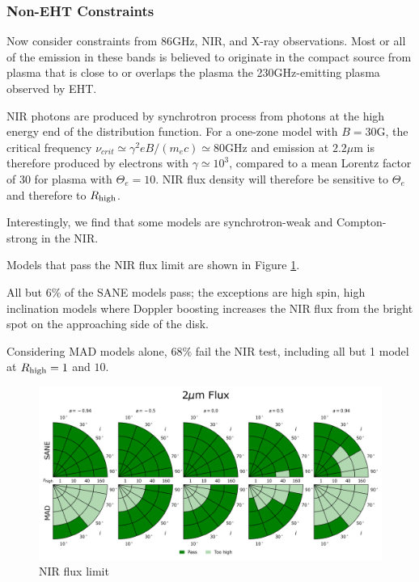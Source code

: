 \subsubsection{Non-EHT Constraints}

Now consider constraints from 86GHz, NIR, and X-ray observations.  Most or all of the emission in these bands is believed to originate in the compact source from plasma that is close to or overlaps the plasma the 230GHz-emitting plasma observed by EHT.



NIR photons are produced by synchrotron process from photons at the high energy end of the distribution function.  For a one-zone model with $B = 30$G, the  critical frequency $\nu_{crit} \simeq \gamma^2 e B/(m_e c) \simeq 80$GHz and emission at $2.2\mu$m is therefore produced by electrons with $\gamma \simeq 10^3$, compared to a mean Lorentz factor of $30$ for plasma with $\Theta_e = 10$.  NIR flux density will therefore be sensitive to $\Theta_e$ and therefore to $R_\mathrm{high}$.

Interestingly, we find that some models are synchrotron-weak and Compton-strong in the NIR.  

Models that pass the NIR flux limit are shown in Figure \ref{fig:cmp_2um_flux}.

All but $6\%$ of the SANE models pass; the exceptions are high spin, high inclination models where Doppler boosting increases the NIR flux from the bright spot on the approaching side of the disk.

Considering MAD models alone, $68\%$ fail the NIR test, including all but 1 model at $R_\mathrm{high} = 1$ and $10$.

\begin{figure}
  \centering
  \includegraphics[width=\columnwidth]{./figures/2um_flux_Constraints.png}
  \caption{NIR flux limit}
  \label{fig:cmp_2um_flux}
\end{figure}

